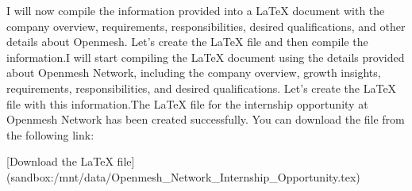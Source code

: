 I will now compile the information provided into a LaTeX document with the company overview, requirements, responsibilities, desired qualifications, and other details about Openmesh. Let's create the LaTeX file and then compile the information.I will start compiling the LaTeX document using the details provided about Openmesh Network, including the company overview, growth insights, requirements, responsibilities, and desired qualifications. Let's create the LaTeX file with this information.The LaTeX file for the internship opportunity at Openmesh Network has been created successfully. You can download the file from the following link:

[Download the LaTeX file](sandbox:/mnt/data/Openmesh_Network_Internship_Opportunity.tex)